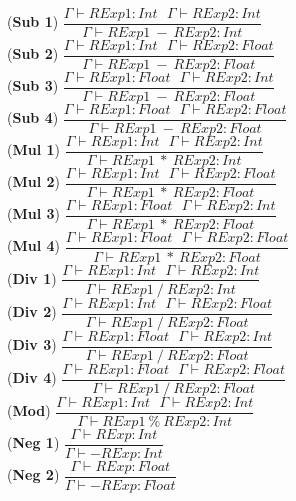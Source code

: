 \documentclass[12pt]{article}
\begin{document}
\begin{center}
\noindent(\textbf{Sub 1})
$\dfrac{\Gamma \vdash RExp1:Int\ \ \ \Gamma \vdash RExp2:Int}{\Gamma \vdash RExp1\ -\ RExp2:Int}$\\[0.1in]
\noindent(\textbf{Sub 2})
$\dfrac{\Gamma \vdash RExp1:Int\ \ \ \Gamma \vdash RExp2:Float}{\Gamma \vdash RExp1\ -\ RExp2:Float}$\\[0.1in]
\noindent(\textbf{Sub 3})
$\dfrac{\Gamma \vdash RExp1:Float\ \ \ \Gamma \vdash RExp2:Int}{\Gamma \vdash RExp1\ -\ RExp2:Float}$\\[0.1in]
\noindent(\textbf{Sub 4})
$\dfrac{\Gamma \vdash RExp1:Float\ \ \ \Gamma \vdash RExp2:Float}{\Gamma \vdash RExp1\ -\ RExp2:Float}$\\[0.1in]

\noindent(\textbf{Mul 1})
$\dfrac{\Gamma \vdash RExp1:Int\ \ \ \Gamma \vdash RExp2:Int}{\Gamma \vdash RExp1\ *\ RExp2:Int}$\\[0.1in]
\noindent(\textbf{Mul 2})
$\dfrac{\Gamma \vdash RExp1:Int\ \ \ \Gamma \vdash RExp2:Float}{\Gamma \vdash RExp1\ *\ RExp2:Float}$\\[0.1in]
\noindent(\textbf{Mul 3})
$\dfrac{\Gamma \vdash RExp1:Float\ \ \ \Gamma \vdash RExp2:Int}{\Gamma \vdash RExp1\ *\ RExp2:Float}$\\[0.1in]
\noindent(\textbf{Mul 4})
$\dfrac{\Gamma \vdash RExp1:Float\ \ \ \Gamma \vdash RExp2:Float}{\Gamma \vdash RExp1\ *\ RExp2:Float}$\\[0.1in]

\noindent(\textbf{Div 1})
$\dfrac{\Gamma \vdash RExp1:Int\ \ \ \Gamma \vdash RExp2:Int}{\Gamma \vdash RExp1\ /\ RExp2:Int}$\\[0.1in]
\noindent(\textbf{Div 2})
$\dfrac{\Gamma \vdash RExp1:Int\ \ \ \Gamma \vdash RExp2:Float}{\Gamma \vdash RExp1\ /\ RExp2:Float}$\\[0.1in]
\noindent(\textbf{Div 3})
$\dfrac{\Gamma \vdash RExp1:Float\ \ \ \Gamma \vdash RExp2:Int}{\Gamma \vdash RExp1\ /\ RExp2:Float}$\\[0.1in]
\noindent(\textbf{Div 4})
$\dfrac{\Gamma \vdash RExp1:Float\ \ \ \Gamma \vdash RExp2:Float}{\Gamma \vdash RExp1\ /\ RExp2:Float}$\\[0.1in]
\noindent(\textbf{Mod})
$\dfrac{\Gamma \vdash RExp1:Int\ \ \ \Gamma \vdash RExp2:Int}{\Gamma \vdash RExp1\ \%\ RExp2:Int}$\\[0.1in]
\noindent(\textbf{Neg 1})
$\dfrac{\Gamma \vdash RExp:Int}{\Gamma \vdash -RExp:Int}$\\[0.1in]
\noindent(\textbf{Neg 2})
$\dfrac{\Gamma \vdash RExp:Float}{\Gamma \vdash -RExp:Float}$\\[0.1in]


\end{center}
\end{document}
